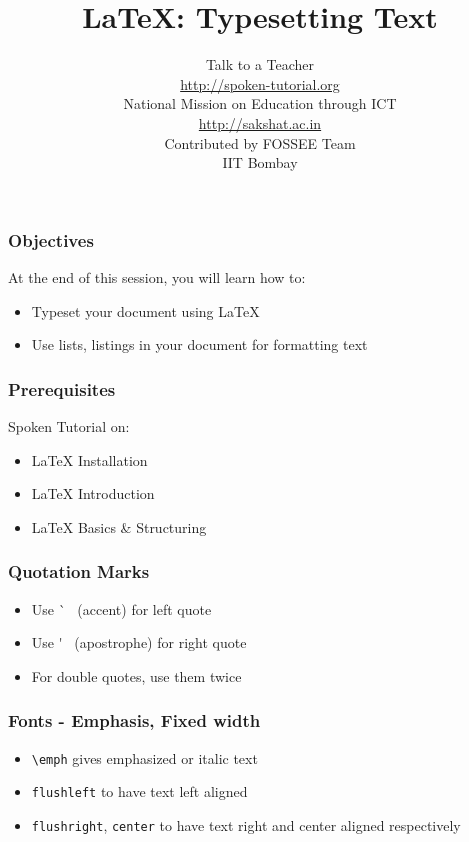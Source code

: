 \documentclass[17pt,compress]{beamer}
\author[FOSSEE]{}
\institute[IIT Bombay]{}
\date[]{}
\newcommand{\typ}[1]{\lstinline{#1}}
\begin{document}
\sffamily \bfseries
\title
[{\LaTeX}: Typesetting Text]
{{\LaTeX}: Typesetting Text}
\author
[FOSSEE]
{\small Talk to a Teacher\\{\color{blue}\url{http://spoken-tutorial.org}}\\\vspace{0.25cm}National Mission on Education
 through ICT\\{\color{blue}\url{ http://sakshat.ac.in}} \\ [1.65cm]
   Contributed by FOSSEE Team \\IIT Bombay  \\[0.3cm]
}

\begin{frame}
   \titlepage
\end{frame}

\begin{frame}
  \frametitle{Objectives}
  At the end of this session, you will learn how to:
  \begin{itemize}
  \item Typeset your document using {\LaTeX}
  \item Use lists, listings in your document for formatting text
  \end{itemize}
\end{frame}

\begin{frame}
  \frametitle{Prerequisites}
  Spoken Tutorial on:
  \begin{itemize}
  \item {\LaTeX} Installation
  \item {\LaTeX} Introduction
  \item {\LaTeX} Basics \& Structuring
  \end{itemize}
\end{frame}

\begin{frame}[fragile]
  \frametitle{Quotation Marks}
  \begin{itemize}
  \item Use \`~ (accent) for left quote
  \item Use \'~ (apostrophe) for right quote
  \item For double quotes, use them twice
  \end{itemize}
\end{frame}

\begin{frame}[fragile]
  \frametitle{Fonts - Emphasis, Fixed width}
  \begin{itemize}
  \item \lstinline{\emph} gives emphasized or italic text
  \item \typ{flushleft} to have text left aligned
  \item \typ{flushright}, \typ{center} to have text right and center aligned respectively
  \end{itemize}
\end{frame}
\end{document}

